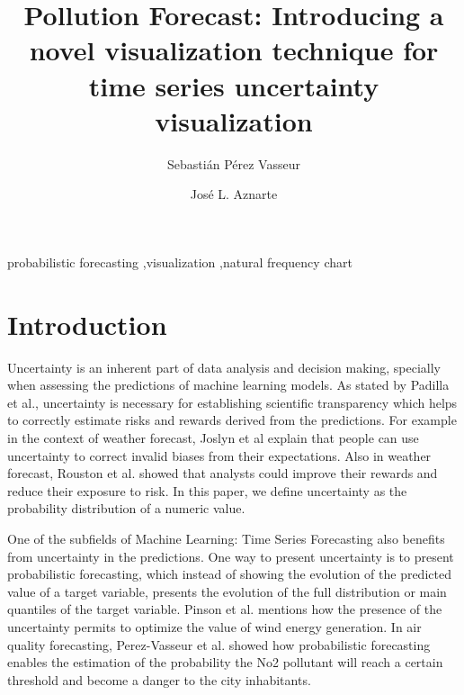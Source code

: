 \documentclass[a4paper,3p,sort&compress]{elsarticle}
\begin{document}
\linenumbers

\newcommand{\no}{NO\textsubscript{2}\xspace}

\begin{frontmatter}

  \title{Pollution Forecast: Introducing a novel visualization technique for time series uncertainty visualization}


  \author{Sebasti\'an P\'erez Vasseur}
  \author{Jos\'e L. Aznarte}
  \address{Artificial Intelligence Department\\Universidad Nacional de
    Educaci\'on a Distancia --- UNED\\c/ Juan del Rosal, 16, Madrid, Spain}
  

\begin{abstract}
  
\end{abstract}

\begin{keyword}
probabilistic forecasting \sep visualization \sep natural frequency chart
\end{keyword}

\end{frontmatter}


\section{Introduction}
\label{sec:intro}

Uncertainty is an inherent part of data analysis and decision making, specially when assessing the predictions 
of machine learning models. As stated by Padilla et al., uncertainty is necessary for establishing 
scientific transparency which helps to correctly estimate risks and rewards
derived from the predictions. For example in the context of weather forecast, Joslyn et al explain 
that people can use uncertainty to correct invalid biases from their expectations.
Also in weather forecast, Rouston et al. 
\cite{roulston_laboratory_2006} showed that analysts could improve their rewards and reduce their exposure 
to risk. In this paper, we define uncertainty as the probability distribution of a numeric value.

One of the subfields of Machine Learning: Time Series Forecasting also benefits from uncertainty in the predictions.
One way to present uncertainty is to present probabilistic forecasting, which instead of showing the evolution 
of the predicted value of a target variable, presents the evolution of the full distribution or main quantiles 
of the target variable. Pinson et al. mentions how the presence of the uncertainty permits to optimize the value 
of wind energy generation. In air quality forecasting, Perez-Vasseur et al. showed how probabilistic forecasting 
enables the estimation of the probability the No2 pollutant will reach a certain threshold and become a danger 
to the city inhabitants.
\end{document}
